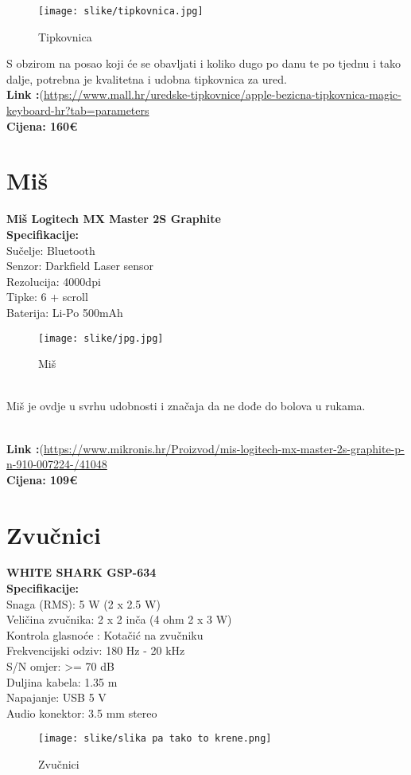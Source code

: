 \documentclass{article}
\begin{document}
\begin{figure}[h!]
    \centering
    \texttt{[image: slike/tipkovnica.jpg]}
    \caption{Tipkovnica}
    \label{fig:method}
\end{figure}



S obzirom na posao koji će se obavljati i koliko dugo po danu te po tjednu i tako dalje, potrebna je kvalitetna i udobna tipkovnica za ured. 
\\ \textbf{Link :}(\url{https://www.mall.hr/uredske-tipkovnice/apple-bezicna-tipkovnica-magic-keyboard-hr?tab=parameters}
\\ \textbf{Cijena: 160€}


\newpage
\section{Miš}
\textbf{Miš Logitech MX Master 2S Graphite}
\\ \textbf{Specifikacije:}
\\Sučelje: Bluetooth
\\Senzor: Darkfield Laser sensor
\\Rezolucija: 4000dpi
\\Tipke: 6 + scroll
\\Baterija: Li-Po 500mAh
\begin{figure}[h!]
    \centering
    \texttt{[image: slike/jpg.jpg]}
    \caption{Miš}
    \label{fig:method}
\end{figure}


\\ Miš je ovdje u svrhu udobnosti i značaja da ne dođe do bolova u rukama.

\\ \textbf{Link :}(\url{https://www.mikronis.hr/Proizvod/mis-logitech-mx-master-2s-graphite-p-n-910-007224-/41048}
\\ \textbf{Cijena: 109€}



 
\newpage
\section{Zvučnici}
\textbf{WHITE SHARK GSP-634}
\\ \textbf{Specifikacije:}
\\Snaga (RMS): 5 W (2 x 2.5 W)
\\Veličina zvučnika: 2 x 2 inča (4 ohm 2 x 3 W)
\\Kontrola glasnoće : Kotačić na zvučniku
\\Frekvencijski odziv: 180 Hz - 20 kHz
\\S/N omjer: >= 70 dB
\\Duljina kabela: 1.35 m
\\Napajanje: USB 5 V
\\Audio konektor: 3.5 mm stereo
\begin{figure}[h!]
    \centering
    \texttt{[image: slike/slika pa tako to krene.png]}
    \caption{Zvučnici}
    \label{fig:method}
\end{figure}
\end{document}

